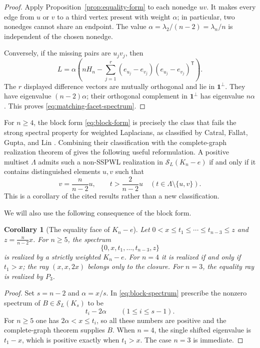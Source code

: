 \documentclass[11pt,reqno]{amsart}
\newtheorem{corollary}[theorem]{Corollary}
\theoremstyle{definition}
\theoremstyle{remark}
\newcommand{\one}{\mathbf 1}
\newcommand{\SL}{\mathcal S_L}
\begin{document}
\begin{proof}
Apply Proposition~\ref{prop:equality-form} to each nonedge $uv$.  It makes
every edge from $u$ or $v$ to a third vertex present with weight $\alpha$;
in particular, two nonedges cannot share an endpoint.  The value
$\alpha=\lambda_2/(n-2)=\lambda_n/n$ is independent of the chosen nonedge.

Conversely, if the missing pairs are $u_jv_j$, then
\[
  L=\alpha\left(nH_n-
    \sum_{j=1}^r(e_{u_j}-e_{v_j})(e_{u_j}-e_{v_j})^{\mathsf T}\right).
\]
The $r$ displayed difference vectors are mutually orthogonal and lie in
$\one^\perp$.  They have eigenvalue $(n-2)\alpha$; their orthogonal
complement in $\one^\perp$ has eigenvalue $n\alpha$.  This proves
\eqref{eq:matching-facet-spectrum}.
\end{proof}

For $n\ge4$, the block form \eqref{eq:block-form} is precisely the class that
fails the strong spectral property for weighted Laplacians, as classified by
Catral, Fallat, Gupta, and Lin \cite[Theorem~4.2]{CFGL2026}.  Combining their
classification with the complete-graph realization theorem of
\cite[Theorem~2.5]{FGL2025} gives the following useful reformulation.  A
positive multiset $\Lambda$ admits such a non-SSPWL realization in
$\SL(K_n-e)$ if and only if it contains distinguished elements $u,v$ such that
\begin{equation}\label{eq:weak-spectrum}
  v=\frac{n}{n-2}u,
  \qquad
  t>\frac{2}{n-2}u\quad(t\in\Lambda\setminus\{u,v\}).
\end{equation}
This is a corollary of the cited results rather than a new classification.

We will also use the following consequence of the block form.

\begin{corollary}[The equality face of $K_n-e$]\label{cor:equality-face}
Let $0<x\le t_1\le\cdots\le t_{n-3}\le z$ and
$z=\frac{n}{n-2}x$.
For $n\ge5$, the spectrum
\[
  \{0,x,t_1,\ldots,t_{n-3},z\}
\]
is realized by a strictly weighted $K_n-e$.  For $n=4$ it is realized if and
only if $t_1>x$; the ray $(x,x,2x)$ belongs only to the closure.  For $n=3$,
the equality ray is realized by $P_3$.
\end{corollary}

\begin{proof}
Set $s=n-2$ and $\alpha=x/s$.  In \eqref{eq:block-spectrum} prescribe the
nonzero spectrum of $B\in\SL(K_s)$ to be
\[
  t_i-2\alpha\qquad(1\le i\le s-1).
\]
For $n\ge5$ one has $2\alpha<x\le t_i$, so all these numbers are positive and
the complete-graph theorem \cite[Theorem~2.5]{FGL2025} supplies $B$.  When
$n=4$, the single shifted eigenvalue is $t_1-x$, which is positive exactly
when $t_1>x$.  The case $n=3$ is immediate.
\end{proof}
\end{document}
